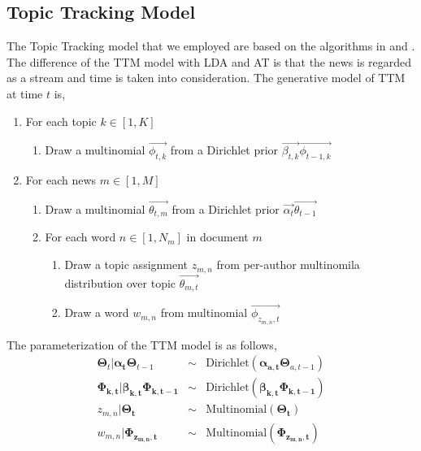 {\begin{algorithm}
\end{algorithm}


 
 
\subsection{Topic Tracking Model}\label{4tot}

The Topic Tracking model that we employed are based on the algorithms in \cite{liangdynamic} and \cite{iwata2009topic}. The difference of the TTM model with LDA and AT is that the news is regarded as a stream and time is taken into consideration. The generative model of TTM at time $t$ is,

\begin{enumerate}
   \item For each topic $k \in [1,K]$
   \begin{enumerate}
     \item Draw a multinomial $\vec{\phi_{t,k}}$ from a Dirichlet prior $\vec{\beta_{t,k}}\vec{\phi_{t-1,k}}$
    \end{enumerate}
    \item For each news $m \in [1,M]$
   \begin{enumerate}
   \item Draw a multinomial $\vec{\theta_{t,m}}$ from a Dirichlet prior $\vec{\alpha_t}\vec{{\theta_{t-1}}}$
     \item For each word $n \in [1,N_m]$ in document $m$
     \begin{enumerate}
            \item Draw a topic assignment $z_{m,n}$ from per-author multinomila distribution over topic $\vec{\theta_{m,t}}$ %
            \item Draw a word $w_{m,n}$ from multinomial $\vec{\phi_{z_{m, n},t}}$
    \end{enumerate}
    \end{enumerate}
        
\end{enumerate}

The parameterization of the TTM model is as follows,
\begin{eqnarray*} \label{eq:dat}
\boldsymbol{\Theta}_{t} | \boldsymbol{\alpha_{t}}
\boldsymbol{\Theta}_{t-1}
& \sim & \text{Dirichlet}({\boldsymbol{\alpha_{a,t}}
\boldsymbol{\Theta}_{a,t-1}})\\
\boldsymbol{\Phi_{k,t}} | \boldsymbol{\beta_{k,t}}\boldsymbol{\Phi_{k,t-1}} & \sim & \text{Dirichlet}(\boldsymbol{\beta_{k,t}}\boldsymbol{\Phi_{k,t-1}})\\
z_{m,n} | \boldsymbol{\Theta_{t}} & \sim & \text{Multinomial}(\boldsymbol{\Theta_{t}})\\
w_{m,n} | \boldsymbol{\Phi_{z_{m,n},t}} & \sim & \text{Multinomial}(\boldsymbol{\Phi_{z_{m,n},t}})\\


\end{eqnarray*}}
